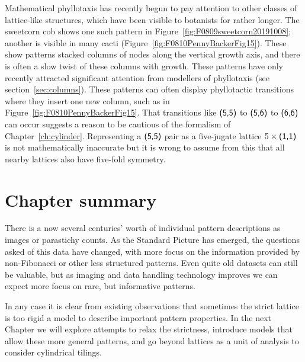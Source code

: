 Mathematical phyllotaxis has recently begun to pay attention to other classes of lattice-like structures, which have been visible to botanists for rather longer.
  The  sweetcorn cob  shows one such pattern in Figure~\ref{fig:F0809sweetcorn20191008}; another is visible in many cacti (Figure~\ref{fig:F0810PennyBackerFig15}). These show patterns stacked columns of nodes along the vertical growth axis, and there is often a slow twist of these columns with growth. These patterns have only recently attracted significant attention from
  modellers of phyllotaxis (see section~\ref{sec:columns}). These patterns can often display phyllotactic transitions where they insert one new column, such as in Figure~\ref{fig:F0810PennyBackerFig15}.
  That transitions like  $\textsf{(5,5)}$ to $\textsf{(5,6)}$ to $\textsf{(6,6)}$ can occur suggests a reason to be cautious of  the formalism of Chapter~\ref{ch:cylinder}. Representing a $\textsf{(5,5)}$ pair as a five-jugate lattice $5\times\textsf{(1,1)}$ is not mathematically inaccurate but it is wrong to assume from this that all nearby lattices also have five-fold symmetry. 
  
  
  
  \section{Chapter summary}
  There is a now several centuries' worth of individual pattern descriptions as images or parastichy counts. As the Standard Picture has emerged, the questions asked of this data have changed, with more focus on the information provided by non-Fibonacci or other less structured patterns. Even quite old datasets can still be valuable, but as imaging and data handling technology improves we can expect more focus on rare, but informative patterns. 
  
  In any case it is clear from existing observations that sometimes the strict lattice is too rigid a model to describe important pattern properties. In the next Chapter we will explore attempts to relax the strictness, introduce models that allow these more general patterns, and 
  go beyond lattices as a unit of analysis to consider cylindrical tilings. 

